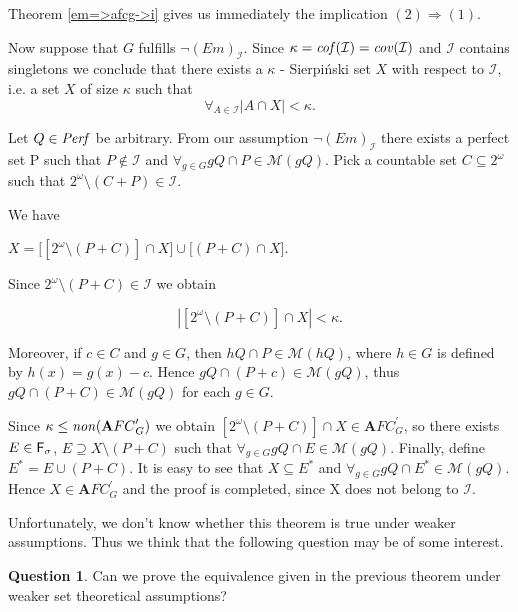 \documentclass[b5cutpaper, twoside, 11pt, leqno]{moravica}
\newcommand{\afcp}{{\mathbf AFC}^\prime}
\newcommand\afcg{\afcp_{G}}
\newcommand{\seq}{\subseteq}
\newcommand{\ca}{2^{\omega}}
\newcommand{\mgr}{{\mathcal M}}
\newcommand{\perf}{{\it Perf}}
\newcommand{\fsigma}{{\sf F}_{\sigma}}
\newcommand{\cof}{{\it cof}}
\newcommand{\cov}{{\it cov}}
\newcommand{\non}{{\it non}}
\newcommand{\calI}{{\mathcal{I}}}
\theoremstyle{definition}
\newtheorem{question}[theorem]{Question}
\begin{document}
\proof

Theorem \ref{em=>afcg->i}
gives us immediately the implication $(2) \Rightarrow (1)$.


  Now suppose that $G$ fulfills $\neg (Em)_{\calI}$.
Since $\kappa = \cof(\calI) = \cov(\calI)$
and $\calI$ contains singletons we conclude that
there exists a $\kappa$ - Sierpi\'nski set $X$ with
respect to $\calI$, i.e. a set $X$ of size
$\kappa$ such that
  \[
    \forall_{A \in \calI} |A \cap X| < \kappa.
  \]



Let $Q \in \perf$ be arbitrary.
From our assumption $\neg (Em)_{\calI}$
there exists a perfect set P
such that $P \not\in \calI$ and
$\forall_{g \in G} gQ \cap P \in \mgr(gQ)$.
  Pick a countable set $C \seq \ca$ such that
$\ca \setminus (C+P) \in \calI$.

We have

$X =
  \big[ [\ca \setminus (P+C) ] \cap X \big]
\cup
  \big[ (P+C) \cap X \big]$.

Since $\ca \setminus (P + C) \in \calI$ we obtain

\[ | [ \ca \setminus (P + C) ] \cap X | < \kappa. \]

Moreover, if $c \in C$ and $g \in G$, then
$hQ \cap P \in \mgr(hQ)$,
where $h \in G$ is defined by $h(x) = g(x) - c$.
  Hence $gQ \cap (P + c) \in \mgr(gQ)$,
thus
  $gQ \cap (P + C) \in \mgr(gQ)$ for each $g \in G$.

  Since $\kappa \leq \non(\afcg)$ we obtain
$[ \ca \setminus (P+C)] \cap X \in \afcg$,
so there exists $E \in \fsigma$,
$E \supseteq X \setminus (P + C)$ such that
$\forall_{g \in G} gQ \cap E \in \mgr(gQ)$.
  Finally, define $E^* = E \cup (P + C)$.
It is easy to see that $X \seq E^*$ and
$\forall_{g \in G} gQ \cap E^* \in \mgr(gQ)$.
  Hence $X \in \afcg$ and the proof is
completed, since X does not belong to $\calI$.
\medskip

  Unfortunately, we don't know whether this
theorem is true under weaker assumptions.
  Thus we think that the following question may be of
some interest.

\begin{question}
Can we prove the equivalence given in the previous theorem
under weaker set theoretical assumptions?
\end{question}

\end{document}
